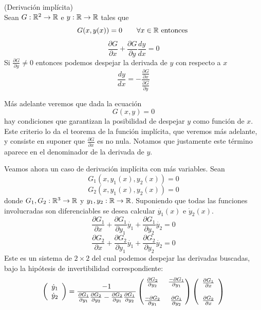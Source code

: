 \begin{ejemplo}{\rm (Derivaci\'on impl\'icita)} 
\\Sean $G:\mathbb{R}^2\to\mathbb{R}$ e $y:\mathbb{R}\to\mathbb{R}$ tales que
$$G(x,y(x))=0\qquad\forall x\in\mathbb{R} \text{ entonces }$$
$$\frac{\partial G}{\partial x}+\frac{\partial G}{\partial y}\frac{dy}{dx}=0$$
Si $\frac{\partial G}{\partial y}\neq 0$ entonces podemos despejar la derivada de $y$ con respecto a $x$
$$\frac{dy}{dx}=-\frac{\frac{\partial G}{\partial x}}{\frac{\partial G}{\partial y}}$$
\end{ejemplo}

\begin{nota}
M\'as adelante veremos que dada la ecuaci\'on $$G(x,y)=0$$
hay condiciones que garantizan la posibilidad de despejar $y$ como funci\'on de $x$. Este criterio lo da el teorema de la funci\'on impl\'icita, que veremos m\'as adelante, y consiste en suponer que $\frac{\partial G}{\partial x}$ es no nula.
Notamos que justamente este t\'ermino aparece en el denominador de la derivada de $y$.
\end{nota}

\begin{ejemplo}
Veamos ahora un caso de derivaci\'on impl\'icita con m\'as variables. Sean
$$G_1(x,y_1(x),y_2(x))=0$$ $$G_2(x,y_1(x),y_2(x))=0$$
donde $G_1,G_2:\mathbb{R}^3\to\mathbb{R}$ y $y_1,y_2:\mathbb{R}\to\mathbb{R}$. 
Suponiendo que todas las funciones involucradas son diferenciables 
se desea calcular $\dot {y_1}(x)$ e $\dot y_2(x)$.
$$\frac{\partial G_1}{\partial x}+\frac{\partial G_1}{\partial y_1}{\dot{y_1}}+\frac{\partial G_1}{\partial y_2}{\dot{y_2}}=0$$
$$\frac{\partial G_2}{\partial x}+\frac{\partial G_2}{\partial y_1}{\dot{y_1}}+\frac{\partial G_2}{\partial y_2}{\dot{y_2}}=0$$
Este es un sistema de $2\times 2$ del cual podemos despejar las derivadas buscadas,
bajo la hip\'otesis de invertibilidad correspondiente:
$$
\left(
\begin{array}{c} \dot y_1\\ \dot y_2\end{array}
\right)=
\frac{-1}{\frac{\partial G_1}{\partial y_1} \frac{\partial G_2}{\partial y_2}-\frac{\partial G_2}{\partial y_1} \frac{\partial G_1}{\partial y_2}}
\begin{pmatrix}
\frac{\partial G_2}{\partial y_2} & \frac{-\partial G_1}{\partial y_1} \\ 
 & \\
\frac{-\partial G_2}{\partial y_1} &  \frac{\partial G_1}{\partial y_2}
\end{pmatrix}
\left(
\begin{array}{c}
\frac{\partial G_1}{\partial x}\\ 
 \\
\frac{\partial G_2}{\partial x}
\end{array}
\right)$$
\end{ejemplo}

